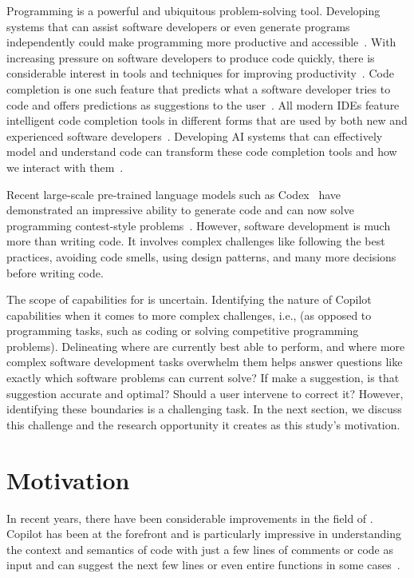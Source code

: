 \label{chapter:introduction}
Programming is a powerful and ubiquitous problem-solving tool. Developing systems that can assist software developers or even generate programs independently could make programming more productive and accessible~\cite{peggyprod}.
With increasing pressure on software developers to produce code quickly, there is considerable interest in tools and techniques for improving productivity~\cite{productivity}.
Code completion is one such feature that predicts what a software developer tries to code and offers predictions as suggestions to the user~\cite{cct}. All modern IDEs feature intelligent code completion tools in different forms that are used by both new and experienced software developers~\cite{cct_usage}. Developing AI systems that can effectively model and understand code can transform these code completion tools and how we interact with them~\cite{cct_usage}.

Recent large-scale pre-trained language models such as Codex~\cite{copilot} have demonstrated an impressive ability to generate code and can now solve programming contest-style problems~\cite{empirical_eval}. 
However, software development is much more than writing code. It involves complex challenges like following the best practices, avoiding code smells, using design patterns, and many more decisions before writing code.

The scope of capabilities for \cct{} is uncertain. Identifying the nature of Copilot capabilities when it comes to more complex challenges, i.e., \AISE{} (as opposed to programming tasks, such as coding or solving competitive programming problems). Delineating where \cct{} are currently best able to perform, and where more complex software development tasks overwhelm them helps answer questions like exactly which software problems can current \cct{} solve? 
If \cct{} make a suggestion, is that suggestion accurate and optimal? Should a user intervene to correct it? However, identifying these boundaries is a challenging task. In the next section, we discuss this challenge and the research opportunity it creates as this study's motivation.

\section{Motivation}
In recent years, there have been considerable improvements in the field of \cct{}. 
Copilot has been at the forefront and is particularly impressive in understanding the context and semantics of code with just a few lines of comments or code as input and can suggest the next few lines or even entire functions in some cases~\cite{copilot}.

